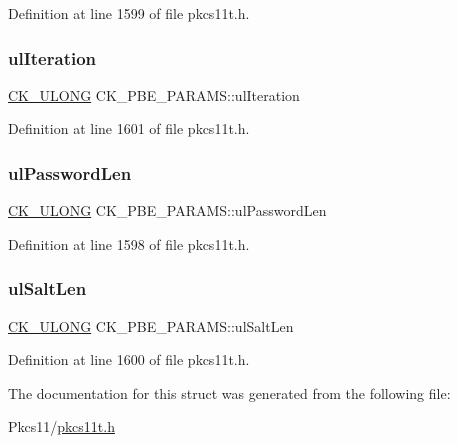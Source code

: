 Definition at line 1599 of file pkcs11t.\+h.

\mbox{\label{struct_c_k___p_b_e___p_a_r_a_m_s_aef88e5c2a740c2fa2ad542ffc3a7fb50}} 
\subsubsection{\texorpdfstring{ul\+Iteration}{ulIteration}}
{\footnotesize\ttfamily \hyperlink{pkcs11t_8h_a35181858a3b7a0a81f49d180d8f446ef}{C\+K\+\_\+\+U\+L\+O\+NG} C\+K\+\_\+\+P\+B\+E\+\_\+\+P\+A\+R\+A\+M\+S\+::ul\+Iteration}



Definition at line 1601 of file pkcs11t.\+h.

\mbox{\label{struct_c_k___p_b_e___p_a_r_a_m_s_a0571a4e448396bcf480e58e3b137e15f}} 
\subsubsection{\texorpdfstring{ul\+Password\+Len}{ulPasswordLen}}
{\footnotesize\ttfamily \hyperlink{pkcs11t_8h_a35181858a3b7a0a81f49d180d8f446ef}{C\+K\+\_\+\+U\+L\+O\+NG} C\+K\+\_\+\+P\+B\+E\+\_\+\+P\+A\+R\+A\+M\+S\+::ul\+Password\+Len}



Definition at line 1598 of file pkcs11t.\+h.

\mbox{\label{struct_c_k___p_b_e___p_a_r_a_m_s_ada93c47b07a867140453cce890cd17be}} 
\subsubsection{\texorpdfstring{ul\+Salt\+Len}{ulSaltLen}}
{\footnotesize\ttfamily \hyperlink{pkcs11t_8h_a35181858a3b7a0a81f49d180d8f446ef}{C\+K\+\_\+\+U\+L\+O\+NG} C\+K\+\_\+\+P\+B\+E\+\_\+\+P\+A\+R\+A\+M\+S\+::ul\+Salt\+Len}



Definition at line 1600 of file pkcs11t.\+h.



The documentation for this struct was generated from the following file\+:\begin{DoxyCompactItemize}
\item 
Pkcs11/\hyperlink{pkcs11t_8h}{pkcs11t.\+h}\end{DoxyCompactItemize}
